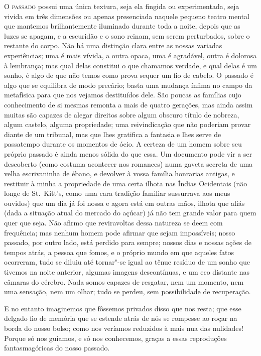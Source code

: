 \textsc{O passado} possui uma única textura, seja ela fingida ou experimentada,
seja vivida em três dimensões ou apenas presenciada naquele pequeno
teatro mental que mantemos brilhantemente iluminado durante toda a
noite, depois que as luzes se apagam, e a escuridão e o sono reinam,
sem serem perturbados, sobre o restante do corpo.  Não há uma distinção
clara entre as nossas variadas experiências; uma é mais vívida, a outra
opaca, uma é agradável, outra é dolorosa à lembrança; mas qual delas
constitui o que chamamos verdade, e qual delas é um sonho, é algo de
que não temos como prova sequer um fio de cabelo.  O passado é algo que
se equilibra de modo precário; basta uma mudança ínfima no campo da
metafísica para que nos vejamos destituídos dele.  São poucas as
famílias cujo conhecimento de si mesmas remonta a mais de quatro
gerações, mas ainda assim muitas são capazes de alegar direitos sobre
algum obscuro título de nobreza, algum castelo, alguma propriedade; uma
reivindicação que não poderiam provar diante de um tribunal, mas que
lhes gratifica a fantasia e lhes serve de passatempo durante os
momentos de ócio.  A certeza de um homem sobre seu próprio passado é
ainda menos sólida do que essa.  Um documento pode vir a ser descoberto
(como costuma acontecer nos romances) numa gaveta secreta de uma velha
escrivaninha de ébano, e devolver à vossa família honrarias antigas, e
restituir à minha a propriedade de uma certa ilhota nas Índias
Ocidentais (não longe de St.~Kitt’s, como uma cara tradição familiar
sussurrava aos meus ouvidos) que um dia já foi nossa e agora está em
outras mãos, ilhota que aliás (dada a situação atual do mercado do
açúcar) já não tem grande valor para quem quer que seja.  Não afirmo
que reviravoltas dessa natureza se deem com frequência; mas nenhum
homem pode afirmar que sejam impossíveis;  nosso passado, por outro
lado, está perdido para sempre; nossos dias e nossas ações de tempos
atrás, a pessoa que fomos, e o próprio mundo em que aqueles fatos
ocorreram, tudo se diluiu até tornar"-se igual ao tênue resíduo de um
sonho que tivemos na noite anterior, algumas imagens descontínuas, e um
eco distante nas câmaras do cérebro.  Nada somos capazes de resgatar,
nem um momento, nem uma sensação, nem um olhar; tudo se perdeu, sem
possibilidade de recuperação.

E no entanto imaginemos que fôssemos privados disso que nos resta; que
esse delgado fio de memória que se estende atrás de nós se rompesse ao
roçar na borda do nosso bolso; como nos veríamos reduzidos à mais nua          
das nulidades!  Porque só nos guiamos, e só nos conhecemos, graças a
essas reproduções fantasmagóricas do nosso passado.

